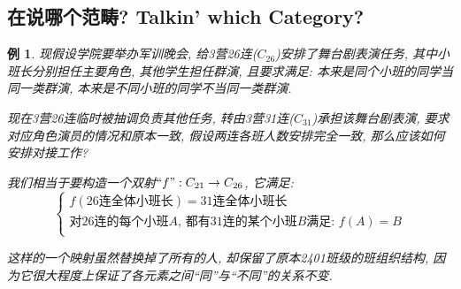 \documentclass[UTF8]{ctexart}
\newcommand{\<}{\langle}
\renewcommand{\>}{\rangle}
\newtheorem{xmp}{例}[subsection]
\begin{document}
        \subsection{在说哪个范畴? Talkin' which Category? }
            
            \begin{xmp}
                现假设学院要举办军训晚会, 给3营26连($C_{26}$)安排了舞台剧表演任务, 其中小班长分别担任主要角色, 其他学生担任群演, 且要求满足: 本来是同个小班的同学当同一类群演, 本来是不同小班的同学不当同一类群演. 

                现在3营26连临时被抽调负责其他任务, 转由3营31连($C_{31}$)承担该舞台剧表演, 要求对应角色演员的情况和原本一致, 假设两连各班人数安排完全一致, 那么应该如何安排对接工作? 

                我们相当于要构造一个双射$``f":C_{21}\to C_{26}$, 它满足: 
                \[\begin{cases}
                    f(\text{26连全体小班长})=\text{31连全体小班长}\\
                    \text{对26连的每个小班$A$, 都有31连的某个小班$B$满足: }f(A)=B\\
                \end{cases}\]

                这样的一个映射虽然替换掉了所有的人, 却保留了原本2401班级的班组织结构, 因为它很大程度上保证了各元素之间``同''与``不同''的关系不变. 
            \end{xmp}
            
\end{document}
